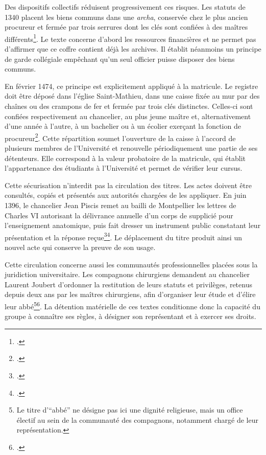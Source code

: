 Des dispositifs collectifs réduisent progressivement ces risques. Les statuts de 1340 placent les biens communs dans une \emph{archa}, conservée chez le plus ancien procureur et fermée par trois serrures dont les clés sont confiées à des maîtres différents\footcite{Statuts1340}. Le texte concerne d'abord les ressources financières et ne permet pas d'affirmer que ce coffre contient déjà les archives. Il établit néanmoins un principe de garde collégiale empêchant qu'un seul officier puisse disposer des biens communs.

En février 1474, ce principe est explicitement appliqué à la matricule. Le registre doit être déposé dans l'église Saint-Mathieu, dans une caisse fixée au mur par des chaînes ou des crampons de fer et fermée par trois clés distinctes. Celles-ci sont confiées respectivement au chancelier, au plus jeune maître et, alternativement d'une année à l'autre, à un bachelier ou à un écolier exerçant la fonction de procureur\footcite[p.~X, vue~29 de la version numérisée]{CalmetteCartulaire1912}. Cette répartition soumet l'ouverture de la caisse à l'accord de plusieurs membres de l'Université et renouvelle périodiquement une partie de ses détenteurs. Elle correspond à la valeur probatoire de la matricule, qui établit l'appartenance des étudiants à l'Université et permet de vérifier leur cursus.

Cette sécurisation n'interdit pas la circulation des titres. Les actes doivent être consultés, copiés et présentés aux autorités chargées de les appliquer. En juin 1396, le chancelier Jean Piscis remet au bailli de Montpellier les lettres de Charles VI autorisant la délivrance annuelle d'un corps de supplicié pour l'enseignement anatomique, puis fait dresser un instrument public constatant leur présentation et la réponse reçue\footcite{AHFMB17}\footcite{PresentationCadavres1396}. Le déplacement du titre produit ainsi un nouvel acte qui conserve la preuve de son usage.

Cette circulation concerne aussi les communautés professionnelles placées sous la juridiction universitaire. Les compagnons chirurgiens demandent au chancelier Laurent Joubert d'ordonner la restitution de leurs statuts et privilèges, retenus depuis deux ans par les maîtres chirurgiens, afin d'organiser leur étude et d'élire leur abbé\footnote{Le titre d'\enquote{abbé} ne désigne pas ici une dignité religieuse, mais un office électif au sein de la communauté des compagnons, notamment chargé de leur représentation.}\footcite{AHFML2}. La détention matérielle de ces textes conditionne donc la capacité du groupe à connaître ses règles, à désigner son représentant et à exercer ses droits.

